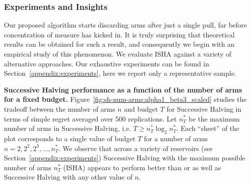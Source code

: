 \subsubsection{Experiments and Insights}\label{fb-experiments}
Our proposed algorithm starts discarding arms after just a single pull, far before concentration of measure has kicked in. 
It is truly surprising that theoretical results can be obtained for such a result, and consequently we begin with an empirical study of this phenomenon. 
We evaluate ISHA against a variety of alternative approaches. Our exhaustive experiments can be found in Section~\ref{appendix:experiments}, here we report only a representative sample.

\textbf{Successive Halving performance as a function of the number of arms for a fixed budget.}
Figure~\ref{fig:sh-num-arms:alpha1_beta3_scaled} studies the tradeoff between the number of arms $n$ and budget $T$ for Successive Halving in terms of simple regret averaged over 500 replications. Let $n^*_T$ be the maximum number of arms in Successive Halving,
i.e. $T \geq n^*_T \log_2 n^*_T$.
Each ``sheet'' of the plot corresponds to a single value of budget $T$ for a number of arms $n=2,2^2,2^3,\dots,n^*_T$.
We observe that across a variety of reservoirs (see Section~\ref{appendix:experiments}) Successive Halving with the maximum possible number of arms $n^*_T$ (ISHA) appears to perform better than or as well as Successive Halving with any other value of $n$.


